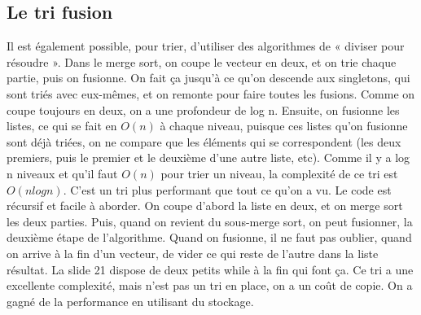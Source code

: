 \documentclass[10pt]{article}
\begin{document}
\subsection{Le tri fusion}
Il est également possible, pour trier, d'utiliser des algorithmes de « diviser pour résoudre ». Dans le merge sort, on coupe le vecteur en deux, et on trie chaque partie, puis on fusionne. On fait ça jusqu'à ce qu'on descende aux singletons, qui sont triés avec eux-mêmes, et on remonte pour faire toutes les fusions.  
\newline \newline 
Comme on coupe toujours en deux, on a une profondeur de log n. Ensuite, on fusionne les listes, ce qui se fait en $O(n)$ à chaque niveau, puisque ces listes qu'on fusionne sont déjà triées, on ne compare que les éléments qui se correspondent (les deux premiers, puis le premier et le deuxième d'une autre liste, etc). 
\newline \newline 
Comme il y a log n niveaux et qu'il faut $O(n)$ pour trier un niveau, la complexité de ce tri est $O(n log n)$. C'est un tri plus performant que tout ce qu'on a vu. 
\newline \newline 
Le code est récursif et facile à aborder. On coupe d'abord la liste en deux, et on merge sort les deux parties. Puis, quand on revient du sous-merge sort, on peut fusionner, la deuxième étape de l'algorithme. Quand on fusionne, il ne faut pas oublier, quand on arrive à la fin d'un vecteur, de vider ce qui reste de l'autre dans la liste résultat. La slide 21 dispose de deux petits while à la fin qui font ça. 
\newline \newline 
Ce tri a une excellente complexité, mais n'est pas un tri en place, on a un coût de copie. On a gagné de la performance en utilisant du stockage. 
\end{document}
